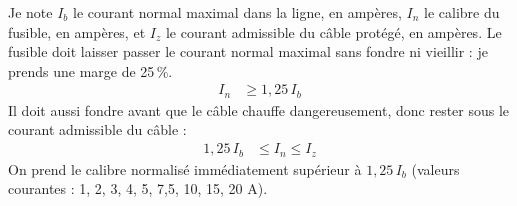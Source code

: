 \begin{demonstration}
Je note $I_b$ le courant normal maximal dans la ligne, en ampères, $I_n$ le calibre du fusible, en ampères, et $I_z$ le courant admissible du câble protégé, en ampères. Le fusible doit laisser passer le courant normal maximal sans fondre ni vieillir : je prends une marge de 25\,\%.
\begin{align*}
I_n &\geq 1{,}25\, I_b
\end{align*}
Il doit aussi fondre avant que le câble chauffe dangereusement, donc rester sous le courant admissible du câble :
\begin{align*}
1{,}25\, I_b &\leq I_n \leq I_z
\end{align*}
On prend le calibre normalisé immédiatement supérieur à $1{,}25\, I_b$ (valeurs courantes : 1, 2, 3, 4, 5, 7,5, 10, 15, 20 A).
\end{demonstration}

